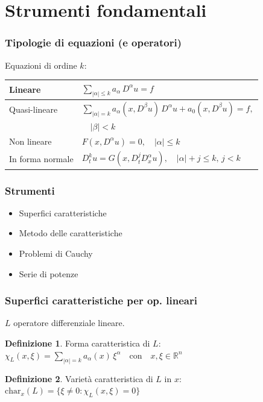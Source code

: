 \documentclass[serif,notheorems]{beamer}
\theoremstyle{definition} %
\newtheorem{definition}{Definizione}[section] %
\theoremstyle{remark}
\begin{document}
\section{Strumenti fondamentali}

\begin{frame}
\frametitle{Tipologie di equazioni (e operatori)}
Equazioni di ordine $k$:
\begin{table}
\renewcommand{\arraystretch}{2}
\begin{tabular}{l l} 
\hline \hline
 Lineare & $\sum_{|\alpha |\leq k} a_\alpha \, D^\alpha u = f$ \\
 \hline
 \vspace{-2mm}
 Quasi-lineare & $\sum_{|\alpha |= k} a_\alpha (x,D^\beta u) \, D^\alpha u +  a_0(x,D^\beta u)= f,$\\
 & $\quad |\beta |<k $ \\
 \hline
 Non lineare & $F(x,D^\alpha u)=0, \quad |\alpha | \leq k$ \\
 \hline
 In forma normale & $D_{t}^k u = G(x,D^j_t D^\alpha_x u), \quad |\alpha |+j \leq k, \, j < k$ \\
 \hline \hline
\end{tabular}
\end{table}
\end{frame}

\begin{frame}
\frametitle{Strumenti}
\begin{itemize}
\item Superfici caratteristiche
\item Metodo delle caratteristiche
\item Problemi di Cauchy
\item Serie di potenze
\end{itemize}

\end{frame}

\begin{frame}
\frametitle{Superfici caratteristiche per op. lineari}
$L$ operatore differenziale lineare.
\begin{definition}
Forma caratteristica di $L$:\\ $\chi_L(x,\xi)=\sum\limits_{|\alpha |= k} a_\alpha(x) \, \xi^\alpha \quad \text{con} \quad x,\xi \in \mathbb{R}^n$
\end{definition}

\begin{definition}
Varietà caratteristica di $L$ in $x$:\\ $\text{char}_x (L)= \{ \xi \neq 0 : \chi_L(x,\xi)=0 \}$
\end{definition}
\end{frame}
\end{document}
